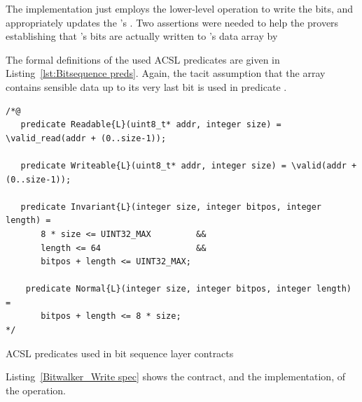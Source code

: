 The implementation just employs the lower-level operation
 to
write the bits, and appropriately updates the 's
.
%
Two assertions were needed to help the provers establishing that
's
bits are actually written to 's data array by



The formal definitions of the used ACSL predicates are given in
Listing~\ref{lst:Bitsequence preds}.
%
Again, the tacit assumption that the array contains sensible data
up to its very last bit is used in predicate .



\begin{listing}[hbt]
\begin{minipage}{0.99\textwidth}
\begin{lstlisting}[style=acsl-block]
/*@
   predicate Readable{L}(uint8_t* addr, integer size) = \valid_read(addr + (0..size-1));

   predicate Writeable{L}(uint8_t* addr, integer size) = \valid(addr + (0..size-1));

   predicate Invariant{L}(integer size, integer bitpos, integer length) =
       8 * size <= UINT32_MAX         &&
       length <= 64                   &&
       bitpos + length <= UINT32_MAX;

    predicate Normal{L}(integer size, integer bitpos, integer length) =
       bitpos + length <= 8 * size;
*/
\end{lstlisting}
\end{minipage}
\caption{\label{lst:Bitsequence preds} ACSL predicates used in bit sequence layer contracts}
\end{listing}


\FloatBarrier


Listing~\ref{Bitwalker_Write spec} shows the contract, and the
implementation, of the
 operation.


